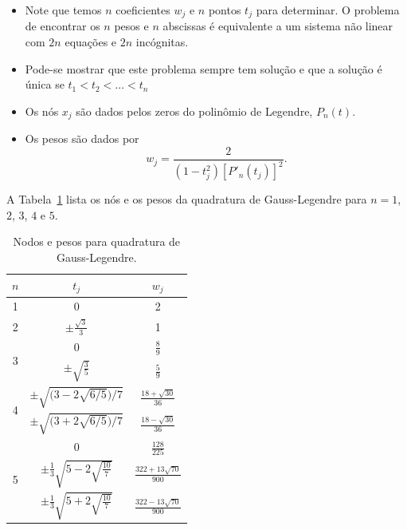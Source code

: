 \begin{itemize}
\item Note que temos $n$ coeficientes $w_j$ e $n$ pontos $t_j$ para determinar. O problema de encontrar os $n$ pesos e $n$ abscissas é equivalente a um sistema não linear com $2n$ equações e $2n$ incógnitas.
\item Pode-se mostrar que este problema sempre tem solução e que a solução é única se $t_1<t_2<\ldots <t_n$
\item Os nós $x_j$ são dados pelos zeros do polinômio de Legendre, $P_n(t)$.
\item Os pesos são dados por
$$w_j = \frac{2}{\left( 1-t_j^2 \right) [P'_n(t_j)]^2}.$$
\end{itemize}

A Tabela~\ref{tab:gauss-legendre} lista os nós e os pesos da quadratura de Gauss-Legendre para $n=1$, $2$, $3$, $4$ e $5$.

\renewcommand{\arraystretch}{2.25}
\begin{table}
  \centering
  \caption{Nodos e pesos para quadratura de Gauss-Legendre.}
  \begin{tabular}{c|cc}
    $n$ & $t_j$ & $w_j$\\[2pt]\hline
    1  & 0 & 2 \\ \hline
    2  & $\displaystyle \pm \frac{\sqrt{3}}{3}$ & 1 \\ \hline
    \multirow{2}{*}{3} &0& $\displaystyle \frac{8}{9}$ \\
        & $\displaystyle \pm \sqrt{\frac{3}{5}}$ & $\displaystyle \frac{5}{9}$ \\\hline
    \multirow{2}{*}{4} & $\displaystyle \pm\sqrt{\Big( 3 - 2\sqrt{6/5} \Big)/7}$ & $\displaystyle \tfrac{18+\sqrt{30}}{36}$\\
        & $\displaystyle \pm\sqrt{\Big( 3 + 2\sqrt{6/5} \Big)/7}$ & $\displaystyle \tfrac{18-\sqrt{30}}{36}$\\\hline
    \multirow{3}{*}{5} & $0$ & $\displaystyle \frac{128}{225}$\\
                       & $\displaystyle \pm\frac{1}{3}\sqrt{5-2\sqrt{\frac{10}{7}}}$ & $\displaystyle \frac{322+13\sqrt{70}}{900}$\\[10pt]
                       & $\displaystyle \pm\frac{1}{3}\sqrt{5+2\sqrt{\frac{10}{7}}}$ & $\displaystyle \frac{322-13\sqrt{70}}{900}$\\[10pt]\hline
\end{tabular}
  \label{tab:gauss-legendre}
\end{table}
\renewcommand{\arraystretch}{1.25}

